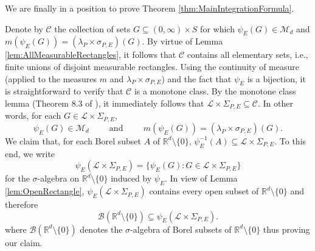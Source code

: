 \documentclass[smallextended]{svjour3}
\theoremstyle{remark}
\renewenvironment{proof}[1][\proofname]{\renewcommand\xproofname{#1}\xproof}{\endxproof}
\begin{document}
\noindent We are finally in a position to prove Theorem \ref{thm:MainIntegrationFormula}.


\begin{proof}[Proof of Theorem \ref{thm:MainIntegrationFormula}]
Denote by $\mathcal{C}$ the collection of sets $G\subseteq (0,\infty)\times S$ for which $\psi_E(G)\in \mathcal{M}_d$ and $m(\psi_E(G))=(\lambda_P\times\sigma_{P,E})(G).$ By virtue of Lemma \ref{lem:AllMeasurableRectangles}, it follows that $\mathcal{C}$ contains all elementary sets, i.e., finite unions of disjoint measurable rectangles. Using the continuity of measure (applied to the measures $m$ and $\lambda_P\times\sigma_{P,E}$) and the fact that $\psi_E$ is a bijection, it is straightforward to verify that $\mathcal{C}$ is a monotone class. By the monotone class lemma (Theorem 8.3 of \cite{rudin_real_1987}), it immediately follows that $\mathcal{L}\times\Sigma_{P,E}\subseteq\mathcal{C}$. In other words, for each $G\in\mathcal{L}\times\Sigma_{P,E}$,
\begin{equation}\label{eq:Good1}
\psi_E(G)\in\mathcal{M}_d\hspace{1cm}\mbox{and}\hspace{1cm}m(\psi_E(G))=(\lambda_P\times\sigma_{P,E})(G).
\end{equation}
We claim that, for each Borel subset $A$ of $\mathbb{R}^d\setminus\{0\}$, $\psi_E^{-1}(A)\subseteq \mathcal{L}\times\Sigma_{P,E}$. To this end, we write
\begin{equation*}
\psi_E(\mathcal{L}\times\Sigma_{P,E})=\{\psi_E(G):G\in\mathcal{L}\times\Sigma_{P,E}\}
\end{equation*}
for the $\sigma$-algebra on $\mathbb{R}^d\setminus\{0\}$ induced by $\psi_E$. In view of Lemma \ref{lem:OpenRectangle}, $\psi_E(\mathcal{L}\times\Sigma_{P,E})$ contains every open subset of $\mathbb{R}^d\setminus\{0\}$ and therefore
\begin{equation*}
\mathcal{B}(\mathbb{R}^d\setminus\{0\})\subseteq\psi_E(\mathcal{L}\times\Sigma_{P,E}).
\end{equation*}
where $\mathcal{B}(\mathbb{R}^d\setminus\{0\})$ denotes the $\sigma$-algebra of Borel subsets of $\mathbb{R}^d\setminus\{0\}$ thus proving our claim. 


\end{proof}
\end{document}
